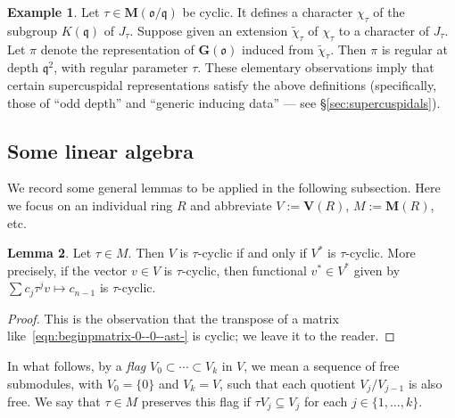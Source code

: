 \documentclass[reqno]{amsart}
\theoremstyle{plain} \newtheorem{theorem} {Theorem} \newtheorem{conjecture} {Conjecture} \newtheorem{corollary} [theorem] {Corollary} \newtheorem{proposition} [theorem] {Proposition} \newtheorem{fact} [theorem] {Fact}
\theoremstyle{definition} \newtheorem{definition} [theorem] {Definition}
\newtheorem{example} [theorem] {Example} \newtheorem{assertion}
\theoremstyle{itplain} %
\newtheorem{lemma}[theorem]{Lemma}
\newcommand{\mfq}{\mathfrak{q}}
\begin{document}
\begin{example}\label{example:let-tau-in-mathbfmm-be-cycl-it-defin-char-chi_t-o}
  Let $\tau \in \mathbf{M}(\mathfrak{o}/\mfq)$ be cyclic.  It defines a character $\chi_\tau$ of the subgroup $K(\mfq)$ of $J_\tau$.  Suppose given an extension $\tilde{\chi}_\tau$ of $\chi_\tau$ to a character of $J_\tau$.  Let $\pi$ denote the representation of $\mathbf{G}(\mathfrak{o})$ induced from $\tilde{\chi}_\tau$.  Then $\pi$ is regular at depth $\mfq^2$, with regular parameter $\tau$.  These elementary observations imply that certain supercuspidal representations satisfy the above definitions (specifically, those of ``odd depth'' and ``generic inducing data'' --- see \S\ref{sec:supercuspidals}).
\end{example}


\subsection{Some linear algebra}\label{sec:cj3m0c59nb}
We record some general lemmas to be applied in the following subsection.  Here we focus on an individual ring $R$ and abbreviate $V := \mathbf{V}(R)$, $M := \mathbf{M}(R)$, etc.

\begin{lemma}\label{lemma:v-tau-cycl-if-only-if-v-tau-cycl-more-prec-if-vect}
  Let $\tau \in M$.  Then $V$ is $\tau$-cyclic if and only if $V^*$ is $\tau$-cyclic.  More precisely, if the vector $v \in V$ is $\tau$-cyclic, then functional $v^* \in V^*$ given by $\sum c _j \tau ^j v \mapsto c_{n-1}$ is $\tau$-cyclic.
\end{lemma}
\begin{proof}
  This is the observation that the transpose of a matrix like~\eqref{eqn:beginpmatrix-0--0--ast-} is cyclic; we leave it to the reader.
\end{proof}

In what follows, by a \emph{flag} $V_0 \subset \dotsb \subset V_k$ in $V$, we mean a sequence of free submodules, with $V_0 = \{0\}$ and $V_k = V$, such that each quotient $V_j / V_{j-1}$ is also free.  We say that $\tau \in M$ preserves this flag if $\tau V_j \subseteq V_j$ for each $j \in \{1, \dotsc, k\}$.
\end{document}
